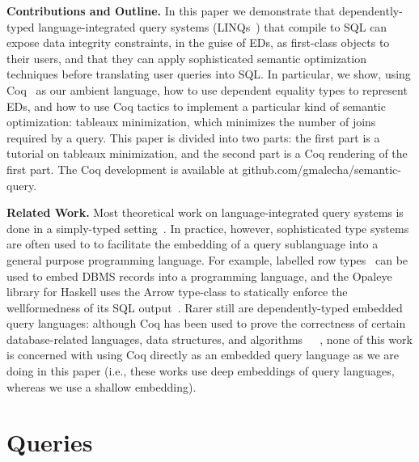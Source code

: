 \documentclass[preprint]{sigplanconf}
\begin{document}
{\bf Contributions and Outline.} In this paper we demonstrate that dependently-typed language-integrated query systems (LINQs~\cite{monad}) that compile to SQL can expose data integrity constraints, in the guise of EDs, as first-class objects to their users, and that they can apply sophisticated semantic optimization techniques before translating user queries into SQL.  In particular, we show, using Coq~\cite{coq:coq} as our ambient language, how to use dependent equality types to represent EDs, and how to use Coq tactics to implement a particular kind of semantic optimization: tableaux minimization, which minimizes the number of joins required by a query.  This paper is divided into two parts: the first part is a tutorial on tableaux minimization, and the second part is a Coq rendering of the first part. The Coq development is available at {\sf github.com/gmalecha/semantic-query}.

{\bf Related Work.} Most theoretical work on language-integrated query systems is done in a simply-typed setting~\cite{tannen:1992:NEQ:645500.655920}.  In practice, however, sophisticated type systems are often used to to facilitate the embedding of a query sublanguage into a general purpose programming language.  For example, labelled row types~\cite{mpj:jones1996a} can be used to embed DBMS records into a programming language, and the Opaleye library for Haskell uses the Arrow type-class to statically enforce the wellformedness of its SQL output~\cite{opaleye}.  Rarer still are dependently-typed embedded query languages: although Coq has been used to prove the correctness of certain database-related languages, data structures, and algorithms~\cite{DBLP:conf/popl/DelawarePGC15}~\cite{Malecha:2010:TVR:1706299.1706329}~\cite{coqdb}, none of this work is concerned with using Coq directly as an embedded query language as we are doing in this paper (i.e., these works use deep embeddings of query languages, whereas we use a shallow embedding).  

\section{Queries}
\end{document}
